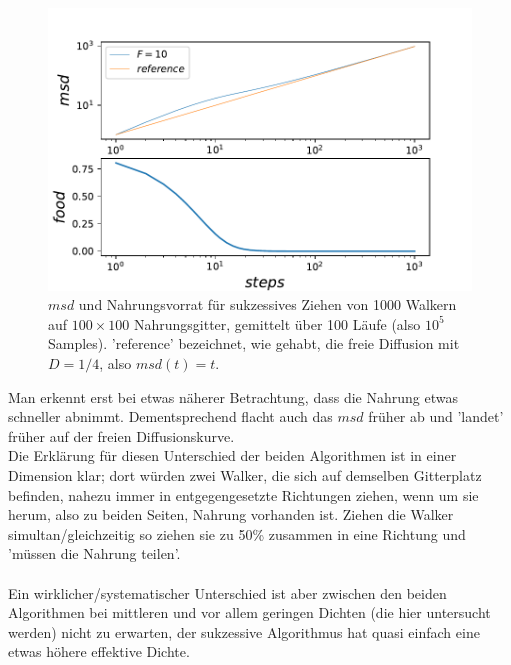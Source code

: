 \documentclass[a4paper, 12pt]{report}
\begin{document}
\begin{figure}[H]
	\centering
	\includegraphics[scale=0.85]{suc10.pdf}
	\caption{$msd$ und Nahrungsvorrat für sukzessives Ziehen von 1000 Walkern auf $100\times 100$ Nahrungsgitter, gemittelt über 100 Läufe (also $10^5$ Samples). 'reference' bezeichnet, wie gehabt, die freie Diffusion mit $D=1/4$, also $msd(t)=t$.}
\end{figure}

\clearpage

\noindent Man erkennt erst bei etwas näherer Betrachtung, dass die Nahrung etwas schneller abnimmt. Dementsprechend flacht auch das $msd$ früher ab und 'landet' früher auf der freien Diffusionskurve. 
\\
\noindent Die Erklärung für diesen Unterschied der beiden Algorithmen ist in einer Dimension klar; dort würden zwei Walker, die sich auf demselben Gitterplatz befinden, nahezu immer in entgegengesetzte Richtungen ziehen, wenn um sie herum, also zu beiden Seiten, Nahrung vorhanden ist. Ziehen die Walker simultan/gleichzeitig so ziehen sie zu 50\% zusammen in eine Richtung und 'müssen die Nahrung teilen'.
\\
\\
\noindent Ein wirklicher/systematischer Unterschied ist aber zwischen den beiden Algorithmen bei mittleren und vor allem geringen Dichten (die hier untersucht werden) nicht zu erwarten, der sukzessive Algorithmus hat quasi einfach eine etwas höhere effektive Dichte.
\end{document}
